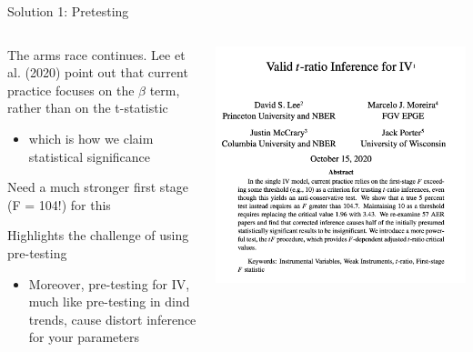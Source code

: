 \documentclass[notes,11pt, aspectratio=169]{beamer}
\newenvironment{wideitemize}{\itemize\addtolength{\itemsep}{10pt}}{\enditemize}
\begin{document}
\begin{frame}{Solution 1: Pretesting}
  \begin{columns}[T] %
    \begin{column}{0.5\textwidth}
      \begin{wideitemize}
      \item The arms race continues. Lee et al. (2020) point out that
        current practice focuses on the $\beta$ term, rather than on
        the t-statistic
        \begin{itemize}
        \item which is how we claim statistical
        significance
        \end{itemize}
      \item Need a much stronger first stage (F = 104!) for this
      \item Highlights the challenge of using pre-testing
        \begin{itemize}
        \item Moreover, pre-testing for IV, much like pre-testing in
          dind trends, cause distort inference for your parameters
        \end{itemize}
      \end{wideitemize}
    \end{column}
    \begin{column}{0.5\textwidth}
       \includegraphics[width=\linewidth]{images/weakiv_armsrace.png}
    \end{column}
  \end{columns}
\end{frame}
\end{document}
